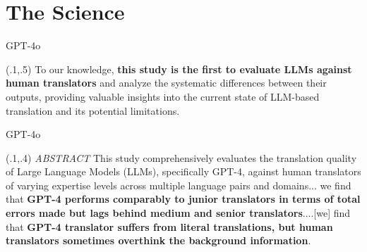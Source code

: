 \documentclass{beamer}
\begin{document}
\section{The Science}

\begin{frame}{GPT-4o}

 
 
 \begin{textblock}{1}(.1,.5)
  \small {To our knowledge, \textbf{this study is the first to evaluate LLMs against human translators} and analyze the systematic differences between their outputs, providing valuable insights into the current state of LLM-based translation and its potential limitations.}
\end{textblock}
 
\end{frame}



\begin{frame}{GPT-4o}


\begin{textblock}{1}(.1,.4)
  \small {\textit{ABSTRACT} This study comprehensively evaluates the translation quality of Large Language Models (LLMs), specifically GPT-4, against human translators of varying expertise levels across multiple language pairs and domains... we find that \textbf{GPT-4 performs comparably to junior translators in terms of total errors made but lags behind medium and senior translators}....[we] find that \textbf{GPT-4 translator suffers from literal translations, but human translators sometimes overthink the background information}.}
\end{textblock}

\end{frame}
\end{document}
